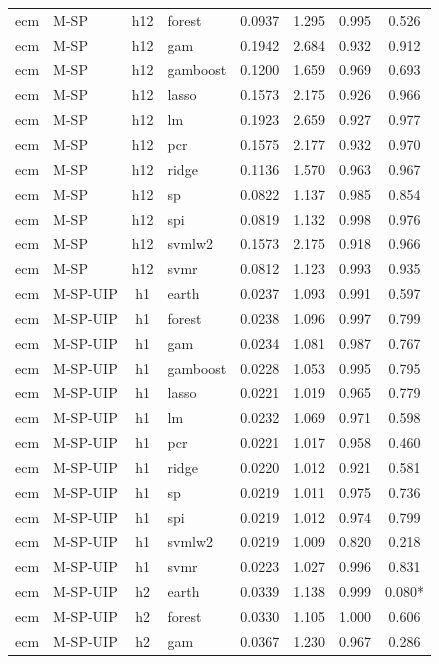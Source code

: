 \begin{ThreePartTable}
\begin{longtable}[t]{llclcccc}
ecm & M-SP & h12 & forest & 0.0937 & 1.295 & 0.995 & 0.526\\
ecm & M-SP & h12 & gam & 0.1942 & 2.684 & 0.932 & 0.912\\
ecm & M-SP & h12 & gamboost & 0.1200 & 1.659 & 0.969 & 0.693\\
ecm & M-SP & h12 & lasso & 0.1573 & 2.175 & 0.926 & 0.966\\
ecm & M-SP & h12 & lm & 0.1923 & 2.659 & 0.927 & 0.977\\
ecm & M-SP & h12 & pcr & 0.1575 & 2.177 & 0.932 & 0.970\\
ecm & M-SP & h12 & ridge & 0.1136 & 1.570 & 0.963 & 0.967\\
ecm & M-SP & h12 & sp & 0.0822 & 1.137 & 0.985 & 0.854\\
ecm & M-SP & h12 & spi & 0.0819 & 1.132 & 0.998 & 0.976\\
ecm & M-SP & h12 & svmlw2 & 0.1573 & 2.175 & 0.918 & 0.966\\
ecm & M-SP & h12 & svmr & 0.0812 & 1.123 & 0.993 & 0.935\\
\addlinespace
ecm & M-SP-UIP & h1 & earth & 0.0237 & 1.093 & 0.991 & 0.597\\
ecm & M-SP-UIP & h1 & forest & 0.0238 & 1.096 & 0.997 & 0.799\\
ecm & M-SP-UIP & h1 & gam & 0.0234 & 1.081 & 0.987 & 0.767\\
ecm & M-SP-UIP & h1 & gamboost & 0.0228 & 1.053 & 0.995 & 0.795\\
ecm & M-SP-UIP & h1 & lasso & 0.0221 & 1.019 & 0.965 & 0.779\\
ecm & M-SP-UIP & h1 & lm & 0.0232 & 1.069 & 0.971 & 0.598\\
ecm & M-SP-UIP & h1 & pcr & 0.0221 & 1.017 & 0.958 & 0.460\\
ecm & M-SP-UIP & h1 & ridge & 0.0220 & 1.012 & 0.921 & 0.581\\
ecm & M-SP-UIP & h1 & sp & 0.0219 & 1.011 & 0.975 & 0.736\\
ecm & M-SP-UIP & h1 & spi & 0.0219 & 1.012 & 0.974 & 0.799\\
ecm & M-SP-UIP & h1 & svmlw2 & 0.0219 & 1.009 & 0.820 & 0.218\\
ecm & M-SP-UIP & h1 & svmr & 0.0223 & 1.027 & 0.996 & 0.831\\
\addlinespace
ecm & M-SP-UIP & h2 & earth & 0.0339 & 1.138 & 0.999 & 0.080*\\
ecm & M-SP-UIP & h2 & forest & 0.0330 & 1.105 & 1.000 & 0.606\\
ecm & M-SP-UIP & h2 & gam & 0.0367 & 1.230 & 0.967 & 0.286\\

\end{longtable}
\end{ThreePartTable}
